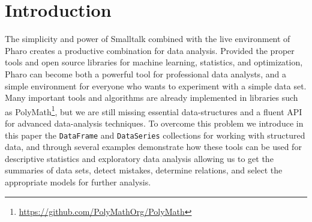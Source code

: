 \documentclass[sigplan]{acmart}
\begin{document}



\maketitle

\section{Introduction}
\label{sec:intro}

%
%
%
%

The simplicity and power of Smalltalk combined with the live environment of Pharo creates a productive combination for data analysis. 
Provided the proper tools and open source libraries for machine learning, statistics, and optimization, Pharo can become both a powerful tool for professional data analysts, and a simple environment for everyone who wants to experiment with a simple data set. Many important tools and algorithms are already implemented in libraries such as PolyMath\footnote{\url{https://github.com/PolyMathOrg/PolyMath}}, but we are still missing essential data-structures and a fluent API for advanced data-analysis techniques. To overcome this problem we introduce in this paper the \texttt{DataFrame} and \texttt{DataSeries} collections for working with structured data, and through several examples demonstrate how these tools can be used for descriptive statistics and exploratory data analysis allowing us to get the summaries of data sets, detect mistakes, determine relations, and select the appropriate models for further analysis.
\end{document}
